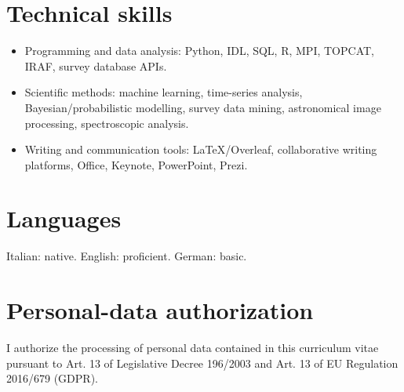 \documentclass[11pt,a4paper]{article}
\begin{document}
\section*{Technical skills}
\begin{itemize}
    \item Programming and data analysis: Python, IDL, SQL, R, MPI, TOPCAT, IRAF, survey database APIs.
    \item Scientific methods: machine learning, time-series analysis, Bayesian/probabilistic modelling, survey data mining, astronomical image processing, spectroscopic analysis.
    \item Writing and communication tools: LaTeX/Overleaf, collaborative writing platforms, Office, Keynote, PowerPoint, Prezi.
\end{itemize}

\section*{Languages}
Italian: native. English: proficient. German: basic.

\section*{Personal-data authorization}
I authorize the processing of personal data contained in this curriculum vitae pursuant to Art. 13 of Legislative Decree 196/2003 and Art. 13 of EU Regulation 2016/679 (GDPR).
\end{document}
